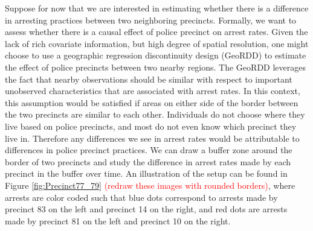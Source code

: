\documentclass[a4paper,11pt]{article}
\begin{document}
Suppose for now that we are interested in estimating whether there is a difference in arresting practices between two neighboring precincts. Formally, we want to assess whether there is a causal effect of police precinct on arrest rates. Given the lack of rich covariate information, but high degree of spatial resolution, one might choose to use a geographic regression discontinuity design (GeoRDD) to estimate the effect of police precincts between two nearby regions. The GeoRDD leverages the fact that nearby observations should be similar with respect to important unobserved characteristics that are associated with arrest rates. In this context, this assumption would be satisfied if areas on either side of the border between the two precincts are similar to each other. Individuals do not choose where they live based on police precincts, and most do not even know which precinct they live in. Therefore any differences we see in arrest rates would be attributable to differences in police precinct practices. We can draw a buffer zone around the border of two precincts and study the difference in arrest rates made by each precinct in the buffer over time. An illustration of the setup can be found in Figure \ref{fig:Precinct77_79} \textcolor{red}{(redraw these images with rounded borders)}, where arrests are color coded such that blue dots correspond to arrests made by precinct 83 on the left and precinct 14 on the right, and red dots are arrests made by precinct 81 on the left and precinct 10 on the right. 
\end{document}
